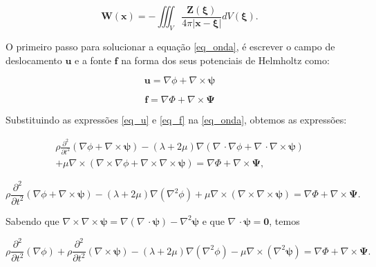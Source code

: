\documentclass[a4paper,10pt]{article}
\begin{document}
\begin{equation}
 \mathbf{W}(\mathbf{x}) = - \iiint_V \frac{\mathbf{Z}(\mathbf{\xi})}{4\pi|\mathbf{x}-\mathbf{\xi}|}dV(\mathbf{\xi}).
\end{equation}

O primeiro passo para solucionar a equação \ref{eq_onda}, é escrever o campo de deslocamento $\mathbf{u}$ e a fonte $\mathbf{f}$ na forma dos seus potenciais de Helmholtz como:

\begin{equation}
 \mathbf{u} = \nabla{\phi} + \nabla\times\mathbf{\psi}
 \label{eq_u}
\end{equation}

\begin{equation}
 \mathbf{f} = \nabla{\Phi} + \nabla\times\mathbf{\Psi}
 \label{eq_f}
\end{equation}

Substituindo as expressões \ref{eq_u} e \ref{eq_f} na \ref{eq_onda}, obtemos as expressões:

\begin{eqnarray}
 \rho\frac{\partial^2}{\partial t^2}(\nabla\phi + \nabla\times\boldsymbol{\psi}) - 
 (\lambda + 2\mu)\nabla(\nabla\,\cdotp\nabla\phi + \nabla\,\cdotp\nabla\times\boldsymbol{\psi}) \nonumber \\
 + \mu\nabla\times(\nabla\times\nabla\phi + \nabla\times\nabla\times\boldsymbol{\psi}) 
 = \nabla\Phi + \nabla\times\mathbf{\Psi},
\end{eqnarray}

\begin{equation}
 \rho\frac{\partial^2}{\partial t^2}(\nabla\phi + \nabla\times\boldsymbol{\psi}) - 
 (\lambda + 2\mu)\nabla(\nabla^2\phi)
 + \mu\nabla\times(\nabla\times\nabla\times\boldsymbol{\psi}) 
 = \nabla\Phi + \nabla\times\mathbf{\Psi}.
\end{equation}

Sabendo que $\nabla\times\nabla\times\boldsymbol{\psi} = 
\nabla(\nabla\,\cdotp\boldsymbol{\psi}) - \nabla^2\boldsymbol{\psi}$ e que 
$\nabla\,\cdotp\boldsymbol{\psi} = \mathbf{0}$, temos

\begin{equation}
 \rho\frac{\partial^2}{\partial t^2}(\nabla\phi) + \rho\frac{\partial^2}{\partial t^2}(\nabla\times\boldsymbol{\psi}) 
 - (\lambda + 2\mu)\nabla(\nabla^2\phi) - \mu\nabla\times(\nabla^2\boldsymbol{\psi})  
 = \nabla\Phi + \nabla\times\mathbf{\Psi}.
 \label{eq:eq_tmp}
\end{equation}
\end{document}
